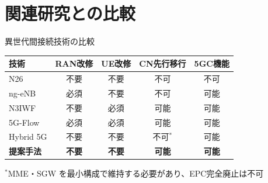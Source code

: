 \documentclass[dvipdfmx,11pt,aspectratio=169]{beamer}
\begin{document}
\section{関連研究との比較}
\begin{frame}{異世代間接続技術の比較}
  \begin{table}
    \tiny
    \begin{tabular}{|l|c|c|c|c|}
      \hline
      \textbf{技術} & \textbf{RAN改修} & \textbf{UE改修} & \textbf{CN先行移行} & \textbf{5GC機能} \\
      \hline
      N26 & 不要 & 不要 & \alert{不可} & 不可 \\
      \hline
      ng-eNB & \alert{必須} & 不要 & \alert{不可} & 可能 \\
      \hline
      N3IWF & 不要 & \alert{必須} & 可能 & 可能 \\
      \hline
      5G-Flow & \alert{必須} & \alert{必須} & 可能 & 可能 \\
      \hline
      Hybrid 5G & 不要 & 不要 & \alert{不可$^*$} & 可能 \\
      \hline
      \textbf{提案手法} & \textbf{\textbf{不要}} & \textbf{\textbf{不要}} & \textbf{\textbf{可能}} & \textbf{\textbf{可能}} \\
      \hline
    \end{tabular}
  \end{table}

  \vspace{0.2cm}
  {\small $^*$MME・SGW を最小構成で維持する必要があり、EPC完全廃止は不可}
\end{frame}
\end{document}
